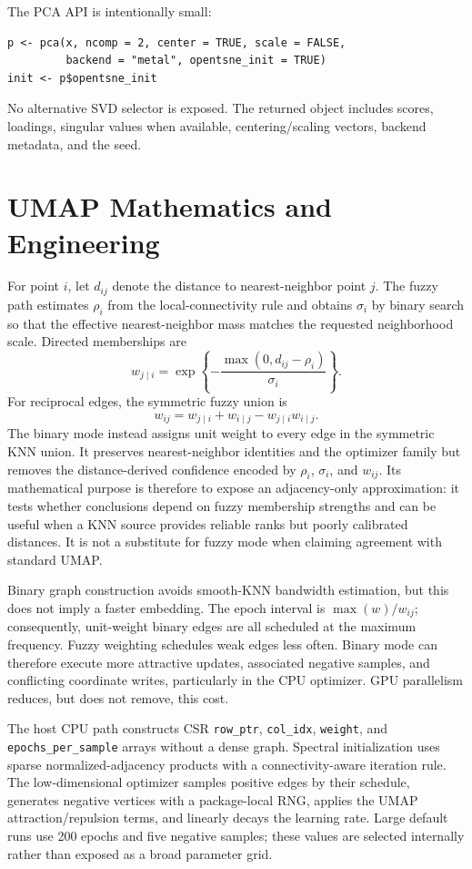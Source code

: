 \documentclass[twoside,11pt]{article}
\begin{document}
The PCA API is intentionally small:
\begin{verbatim}
p <- pca(x, ncomp = 2, center = TRUE, scale = FALSE,
         backend = "metal", opentsne_init = TRUE)
init <- p$opentsne_init
\end{verbatim}
No alternative SVD selector is exposed. The returned object includes scores, loadings, singular values when available, centering/scaling vectors, backend metadata, and the seed.

\section{UMAP Mathematics and Engineering}

For point $i$, let $d_{ij}$ denote the distance to nearest-neighbor point $j$. The fuzzy path estimates $\rho_i$ from the local-connectivity rule and obtains $\sigma_i$ by binary search so that the effective nearest-neighbor mass matches the requested neighborhood scale. Directed memberships are
\[
 w_{j\mid i}=\exp\left\{-\frac{\max(0,d_{ij}-\rho_i)}{\sigma_i}\right\}.
\]
For reciprocal edges, the symmetric fuzzy union is
\[
 w_{ij}=w_{j\mid i}+w_{i\mid j}-w_{j\mid i}w_{i\mid j}.
\]
The binary mode instead assigns unit weight to every edge in the symmetric KNN union. It preserves nearest-neighbor identities and the optimizer family but removes the distance-derived confidence encoded by $\rho_i$, $\sigma_i$, and $w_{ij}$. Its mathematical purpose is therefore to expose an adjacency-only approximation: it tests whether conclusions depend on fuzzy membership strengths and can be useful when a KNN source provides reliable ranks but poorly calibrated distances. It is not a substitute for fuzzy mode when claiming agreement with standard UMAP.

Binary graph construction avoids smooth-KNN bandwidth estimation, but this
does not imply a faster embedding. The epoch interval is
$\max(w)/w_{ij}$; consequently, unit-weight binary edges are all scheduled at
the maximum frequency. Fuzzy weighting schedules weak edges less often.
Binary mode can therefore execute more attractive updates, associated
negative samples, and conflicting coordinate writes, particularly in the CPU
optimizer. GPU parallelism reduces, but does not remove, this cost.

The host CPU path constructs CSR \texttt{row\_ptr}, \texttt{col\_idx}, \texttt{weight}, and \texttt{epochs\_per\_sample} arrays without a dense graph. Spectral initialization uses sparse normalized-adjacency products with a connectivity-aware iteration rule. The low-dimensional optimizer samples positive edges by their schedule, generates negative vertices with a package-local RNG, applies the UMAP attraction/repulsion terms, and linearly decays the learning rate. Large default runs use 200 epochs and five negative samples; these values are selected internally rather than exposed as a broad parameter grid.
\end{document}
